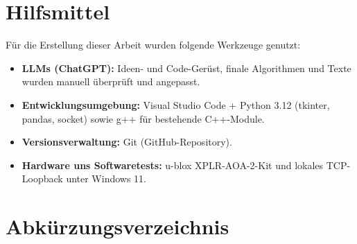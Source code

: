 \documentclass[a4paper, 12pt]{article} %
\begin{document}
\section*{Hilfsmittel}

Für die Erstellung dieser Arbeit wurden folgende Werkzeuge genutzt:

\begin{itemize}[leftmargin=2em]
  \item \textbf{LLMs (ChatGPT):} Ideen- und Code-Gerüst, finale Algorithmen und Texte wurden manuell überprüft und angepasst.
  \item \textbf{Entwicklungs­umgebung:} Visual Studio Code + Python 3.12 (tkinter, pandas, socket) sowie g++ für bestehende C++-Module.
  \item \textbf{Versions­verwaltung:} Git (GitHub-Repository).
  \item \textbf{Hardware uns Softwaretests:} u-blox XPLR-AOA-2-Kit und lokales TCP-Loopback unter Windows 11.
\end{itemize}


\clearpage
\listoffigures

\clearpage

\section*{Abkürzungsverzeichnis}
\begin{acronym}

\end{acronym}

   

   

   

   







\clearpage


\tableofcontents
\end{document}
